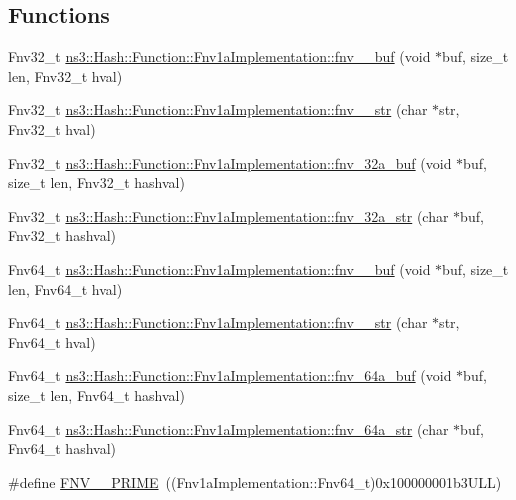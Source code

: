 \subsection*{Functions}
\begin{DoxyCompactItemize}
\item 
Fnv32\+\_\+t \hyperlink{group__hash__fnv_gadaf15dca2b23a80e5cf6ce781da4906c}{ns3\+::\+Hash\+::\+Function\+::\+Fnv1a\+Implementation\+::fnv\+\_\+\_\+buf} (void $\ast$buf, size\+\_\+t len, Fnv32\+\_\+t hval)
\item 
Fnv32\+\_\+t \hyperlink{group__hash__fnv_ga468252c78bf386134ad329d81d4d6eea}{ns3\+::\+Hash\+::\+Function\+::\+Fnv1a\+Implementation\+::fnv\+\_\+\_\+str} (char $\ast$str, Fnv32\+\_\+t hval)
\item 
Fnv32\+\_\+t \hyperlink{group__hash__fnv_gaf1f4a73d8e353e33a70f6a0e9cb44f9b}{ns3\+::\+Hash\+::\+Function\+::\+Fnv1a\+Implementation\+::fnv\+\_\+32a\+\_\+buf} (void $\ast$buf, size\+\_\+t len, Fnv32\+\_\+t hashval)
\item 
Fnv32\+\_\+t \hyperlink{group__hash__fnv_ga6b0ed3c48edfd96df1222d7a414ef6d1}{ns3\+::\+Hash\+::\+Function\+::\+Fnv1a\+Implementation\+::fnv\+\_\+32a\+\_\+str} (char $\ast$buf, Fnv32\+\_\+t hashval)
\item 
Fnv64\+\_\+t \hyperlink{group__hash__fnv_gab250be2cf62835a4221cd58bf8cb136c}{ns3\+::\+Hash\+::\+Function\+::\+Fnv1a\+Implementation\+::fnv\+\_\+\_\+buf} (void $\ast$buf, size\+\_\+t len, Fnv64\+\_\+t hval)
\item 
Fnv64\+\_\+t \hyperlink{group__hash__fnv_ga5de54a6ab9399b2e6780a3867889c568}{ns3\+::\+Hash\+::\+Function\+::\+Fnv1a\+Implementation\+::fnv\+\_\+\_\+str} (char $\ast$str, Fnv64\+\_\+t hval)
\item 
Fnv64\+\_\+t \hyperlink{group__hash__fnv_ga61da2150923405756a0fd5ae19170dd2}{ns3\+::\+Hash\+::\+Function\+::\+Fnv1a\+Implementation\+::fnv\+\_\+64a\+\_\+buf} (void $\ast$buf, size\+\_\+t len, Fnv64\+\_\+t hashval)
\item 
Fnv64\+\_\+t \hyperlink{group__hash__fnv_gaa404ed488258e9943aa51a90e6dea631}{ns3\+::\+Hash\+::\+Function\+::\+Fnv1a\+Implementation\+::fnv\+\_\+64a\+\_\+str} (char $\ast$buf, Fnv64\+\_\+t hashval)
\end{DoxyCompactItemize}
\begin{DoxyCompactItemize}
\item 
\#define \hyperlink{group__hash__fnv_ga843a032e93d6d54b28933d827eb4c966}{F\+N\+V\+\_\+\_\+\+P\+R\+I\+ME}~((Fnv1a\+Implementation\+::\+Fnv64\+\_\+t)0x100000001b3\+U\+L\+L)
\end{DoxyCompactItemize}


